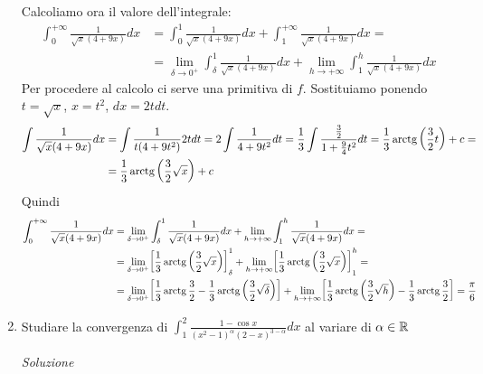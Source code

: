 \documentclass{article}
\begin{document}
\begin{enumerate}[label=\textbf{Esercizio 11.\arabic*.},itemindent=*]
Calcoliamo ora il valore dell'integrale:
\[\begin{aligned}\int_0^{+\infty}\frac{1}{\sqrt{x}(4+9x)}dx&=\int_0^1\frac{1}{\sqrt{x}(4+9x)}dx+\int_1^{+\infty}\frac{1}{\sqrt{x}(4+9x)}dx=\\&=\lim_{\delta\to {0^+}}\int_\delta^1\frac{1}{\sqrt{x}(4+9x)}dx+\lim_{h\to {+\infty}}\int_1^{h}\frac{1}{\sqrt{x}(4+9x)}dx\end{aligned}\]
Per procedere al calcolo ci serve una primitiva di $f$. Sostituiamo ponendo $t=\sqrt{x}$, $x=t^2$, $dx=2tdt$.
\[\begin{aligned}
    \int\frac{1}{\sqrt{x}(4+9x)}dx&=\int\frac{1}{t(4+9t^2)}2tdt=2\int\frac{1}{4+9t^2}dt=\frac{1}{3}\int\frac{\frac{3}{2}}{1+\frac{9}{4}t^2}dt=\frac{1}{3}\operatorname{arctg}\left(\frac{3}{2}t\right)+c=\\&=\frac{1}{3}\operatorname{arctg}\left(\frac{3}{2}\sqrt{x}\right)+c
\end{aligned}\]
Quindi 
\[\begin{aligned}
    \int_0^{+\infty}\frac{1}{\sqrt{x}(4+9x)}dx&=
    \lim_{\delta\to {0^+}}\int_\delta^1\frac{1}{\sqrt{x}(4+9x)}dx+\lim_{h\to {+\infty}}\int_1^{h}\frac{1}{\sqrt{x}(4+9x)}dx=\\&=
    \lim_{\delta\to {0^+}}\biggl[\frac{1}{3}\operatorname{arctg}\left( \frac{3}{2} \sqrt{x}\right)\biggr]_\delta^1+\lim_{h\to {+\infty}}\biggl[\frac{1}{3}\operatorname{arctg}\left( \frac{3}{2} \sqrt{x}\right)\biggr]_1^{h}=\\&=
    \lim_{\delta\to {0^+}}\biggl[\frac{1}{3}\operatorname{arctg}\frac{3}{2}-\frac{1}{3}\operatorname{arctg}\left( \frac{3}{2} \sqrt{\delta}\right)\biggr]+\lim_{h\to {+\infty}}\biggl[\frac{1}{3}\operatorname{arctg}\left( \frac{3}{2} \sqrt{h}\right)-\frac{1}{3}\operatorname{arctg}\frac{3}{2}\biggr]=\frac{\pi}{6}
\end{aligned}\]

\item Studiare la convergenza di $\int_1^2\frac{1-\cos x}{(x^2-1)^\alpha(2-x)^{3-\alpha}}dx$ al variare di $\alpha \in \mathbb{R}$
\item[\textit{\large Soluzione~}]~



\end{enumerate}
\end{document}
